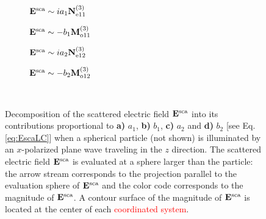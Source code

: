 \begin{figure}[h!]
	\def\svgwidth{1\textwidth} \small
  \vspace*{3.0em}
  \hspace*{0.em}
    \begin{subfigure}{.24\textwidth}\caption{\centering $\vb{E}^\text{sca} \sim  i a_1 \vb{N}^{(3)}_{\text{e}11}$}\label{fig:VSH:a1}\end{subfigure}
  	\begin{subfigure}{.24\textwidth}\caption{\centering $\vb{E}^\text{sca} \sim  - b_1 \vb{M}^{(3)}_{\text{o}11}$}\label{fig:VSH:b1}\end{subfigure}
	\begin{subfigure}{.24\textwidth}\caption{\centering $\vb{E}^\text{sca} \sim  i a_2 \vb{N}^{(3)}_{\text{e}12}$}\label{fig:VSH:a2}\end{subfigure}
	\begin{subfigure}{.24\textwidth}\caption{\centering $\vb{E}^\text{sca} \sim  - b_2 \vb{M}^{(3)}_{\text{o}12}$}\label{fig:VSH:b2}\end{subfigure}
  \vspace*{-6.em}\\
  \vspace*{-2em}
  \caption[Multipolar Contributions to the Scattered Electric Field]{ Decomposition of the  scattered electric field $\vb{E}^\text{sca}$ into its contributions  proportional to \textbf{a)} $a_1$,  \textbf{b)}  $b_1$, \textbf{c)} $a_2$ and \textbf{d)} $b_2$ [see Eq. \eqref{eq:EscaLC}] when a spherical particle (not shown) is illuminated by an $x$-polarized plane wave traveling in the $z$ direction. The scattered electric field $\vb{E}^\text{sca}$ is evaluated at a sphere larger than the particle: the arrow stream corresponds to the projection parallel to the evaluation sphere of $\vb{E}^\text{sca}$  and the color code corresponds to the magnitude of  $\vb{E}^\text{sca}$. A contour surface of the magnitude of $\vb{E}^\text{sca}$ is located at the center of each \textcolor{red}{coordinated system}. }
\label{fig:Multipoles}
\end{figure}

